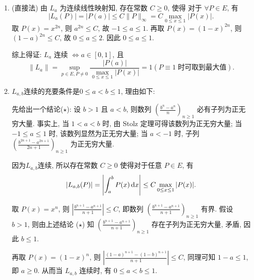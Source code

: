 \begin{enumerate}
\begin{answer}
\begin{enumerate}
        \item {}
        {(直接法) 由 $L_a$ 为连续线性映射知, 存在常数 $C\geq 0$, 使得
        对于 $\forall P\in E$, 有
        \[|L_a(P)|=|P(a)|\leq C\|P\|_{\infty}=C\max_{0\leq x\leq 1}|P(x)|.\]
        取 $P(x)=x^{2n}$, 则 $a^{2n}\leq C$, 故 $-1\leq a\leq 1$.
        再取 $P(x)=(1-x)^{2n}$, 则 $(1-a)^{2n}\leq C$, 故 $0\leq a\leq 2$.
        因此 $0\leq a\leq 1$.
  
        综上得证: $L_a$ 连续 $\Leftrightarrow a\in [0,1]$, 且
        \[\|L_a\|=\sup\limits_{p\in E,P\neq 0} \frac{|P(a)|}{\max_{0\leq x\leq 1}|P(x)|}=1(P\equiv 1\;\text{时可取到最大值}).\]}
  
        \item $L_{a,b}$连续的充要条件是$0\leq a<b\leq 1$, 理由如下:
  
        {
        先给出一个结论($\star$):
        设 $b>1$ 且 $a<b$, 则数列 $\left( \frac{b^n-a^n}{n}\right)_{n\geq 1}$
        必有子列为正无穷大量.
        事实上, 当 $1<a<b$ 时, 由 Stolz 定理可得该数列为正无穷大量;
        当 $-1\leq a\leq 1$ 时, 该数列显然为正无穷大量;
        当 $a<-1$ 时, 子列 $\left( \frac{b^{2n+1}-a^{2n+1}}{2n+1}\right)_{n\geq 1}$
        为正无穷大量.
  
        因为$L_{a,b}$连续, 所以存在常数 $C\geq 0$ 使得对于任意 $P\in E$, 有
        \[|L_{a,b}(P)|=\left\lvert\int_a^b P(x)\mathop{}\!\mathrm{d} x\right\rvert\leq C\max_{0\leq x\leq 1}|P(x)|.\]
  
        取 $P(x)=x^n$, 则 $\left\lvert \frac{b^{n+1}-a^{n+1}}{n+1}\right\rvert\leq C$, 
        即数列 $\left( \frac{b^{n+1}-a^{n+1}}{n+1}\right)_{n\geq 1}$ 有界.
        假设 $b>1$, 则由上述结论 ($\star$) 知 $\left( \frac{b^{n+1}-a^{n+1}}{n+1}\right)_{n\geq 1}$
        存在子列为正无穷大量, 矛盾, 因此 $b\leq 1$.
  
        再取 $P(x)=(1-x)^n$, 则 $\left\lvert \frac{(1-a)^{n+1}-(1-b)^{n+1}}{n+1}\right\rvert\leq C$, 
        同理可知 $1-a\leq 1$, 即 $a\geq 0$. 从而当 $L_{a,b}$ 连续时, 有 $0\leq a<b\leq 1$.
  
}
\end{enumerate}
\end{answer}
\end{enumerate}
